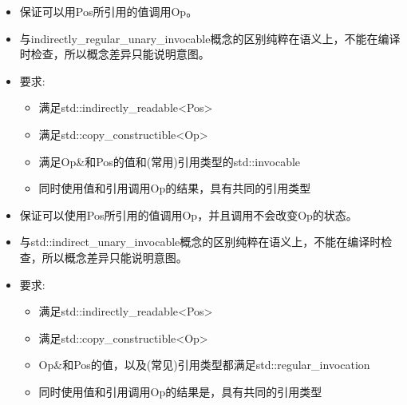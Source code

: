 

\begin{itemize}
\item
保证可以用Pos所引用的值调用Op。

\item
与indirectly\_regular\_unary\_invocable概念的区别纯粹在语义上，不能在编译时检查，所以概念差异只能说明意图。

\item
要求:
\begin{itemize}
\item
满足std::indirectly\_readable<Pos>

\item
满足std::copy\_constructible<Op>

\item
满足Op\&和Pos的值和(常用)引用类型的std::invocable

\item
同时使用值和引用调用Op的结果，具有共同的引用类型
\end{itemize}
\end{itemize}


\begin{itemize}
\item
保证可以使用Pos所引用的值调用Op，并且调用不会改变Op的状态。

\item
与std::indirect\_unary\_invocable概念的区别纯粹在语义上，不能在编译时检查，所以概念差异只能说明意图。

\item
要求:
\begin{itemize}
\item
满足std::indirectly\_readable<Pos>

\item
满足std::copy\_constructible<Op>

\item
Op\&和Pos的值，以及(常见)引用类型都满足std::regular\_invocation

\item
同时使用值和引用调用Op的结果是，具有共同的引用类型
\end{itemize}
\end{itemize}



